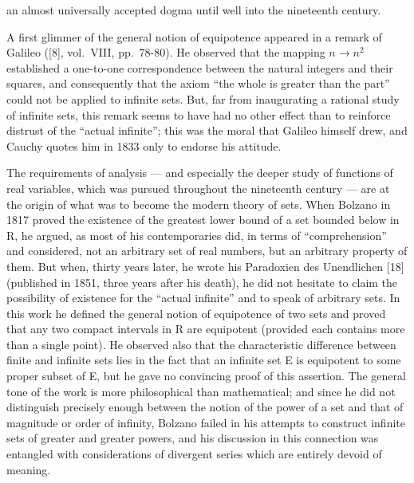 an almost universally accepted dogma until well into the nineteenth century.

A first glimmer of the general notion of equipotence appeared in a remark of Galileo ({[}8{]}, vol.~VIII, pp.~78-80). He observed that the mapping \(n \to n^2\) established a one-to-one correspondence between the natural integers and their squares, and consequently that the axiom ``the whole is greater than the part'' could not be applied to infinite sets. But, far from inaugurating a rational study of infinite sets, this remark seems to have had no other effect than to reinforce distrust of the ``actual infinite''; this was the moral that Galileo himself drew, and Cauchy quotes him in 1833 only to endorse his attitude.

The requirements of analysis --- and especially the deeper study of functions of real variables, which was pursued throughout the nineteenth century --- are at the origin of what was to become the modern theory of sets. When Bolzano in 1817 proved the existence of the greatest lower bound of a set bounded below in R, he argued, as most of his contemporaries did, in terms of ``comprehension'' and considered, not an arbitrary set of real numbers, but an arbitrary property of them. But when, thirty years later, he wrote his Paradoxien des Unendlichen {[}18{]} (published in 1851, three years after his death), he did not hesitate to claim the possibility of existence for the ``actual infinite'' and to speak of arbitrary sets. In this work he defined the general notion of equipotence of two sets and proved that any two compact intervals in R are equipotent (provided each contains more than a single point). He observed also that the characteristic difference between finite and infinite sets lies in the fact that an infinite set E is equipotent to some proper subset of E, but he gave no convincing proof of this assertion. The general tone of the work is more philosophical than mathematical; and since he did not distinguish precisely enough between the notion of the power of a set and that of magnitude or order of infinity, Bolzano failed in his attempts to construct infinite sets of greater and greater powers, and his discussion in this connection was entangled with considerations of divergent series which are entirely devoid of meaning.

